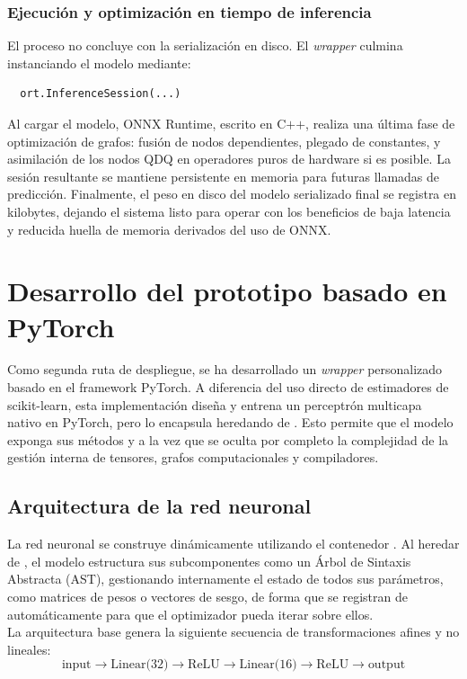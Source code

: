 \documentclass[a4paper,12pt,twoside,final]{book}
\begin{document}
\subsubsection{Ejecución y optimización en tiempo de inferencia}
El proceso no concluye con la serialización en disco. El \textit{wrapper} culmina instanciando el modelo mediante:
\begin{verbatim}
  ort.InferenceSession(...)
\end{verbatim}

Al cargar el modelo, ONNX Runtime, escrito en C$+$$+$, realiza una última fase de optimización de grafos: fusión de nodos
dependientes, plegado de constantes, y asimilación de los nodos QDQ en operadores puros de hardware si es posible. La
sesión resultante se mantiene persistente en memoria para futuras llamadas de predicción. Finalmente, el peso en disco
del modelo serializado final se registra en kilobytes, dejando el sistema listo para operar con los beneficios de baja
latencia y reducida huella de memoria derivados del uso de ONNX.

\section{Desarrollo del prototipo basado en PyTorch}
Como segunda ruta de despliegue, se ha desarrollado un \textit{wrapper} personalizado basado en el framework PyTorch. A
diferencia del uso directo de estimadores de scikit-learn, esta implementación diseña y entrena un perceptrón multicapa 
nativo en PyTorch, pero lo encapsula heredando de . Esto permite que el modelo exponga
sus métodos  y  a la vez que se oculta por completo la complejidad de la gestión interna
de tensores, grafos computacionales y compiladores.

\subsection{Arquitectura de la red neuronal}
La red neuronal se construye dinámicamente utilizando el contenedor . Al heredar de ,
el modelo estructura sus subcomponentes como un Árbol de Sintaxis Abstracta (AST), gestionando internamente el estado
de todos sus parámetros, como matrices de pesos o vectores de sesgo, de forma que se registran de automáticamente para
que el optimizador pueda iterar sobre ellos.\\

La arquitectura base genera la siguiente secuencia de transformaciones afines y no lineales:
\[
\text{input}
\rightarrow
\text{Linear(32)}
\rightarrow
\text{ReLU}
\rightarrow
\text{Linear(16)}
\rightarrow
\text{ReLU}
\rightarrow
\text{output}
\]
\end{document}
